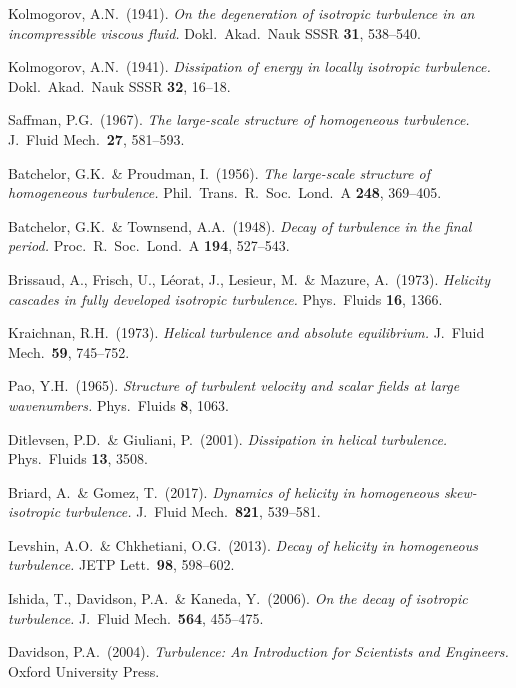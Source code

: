 \documentclass[12pt,a4paper]{article}
\theoremstyle{plain}
\theoremstyle{definition}
\begin{document}
\begin{enumerate}[leftmargin=*, label={[\arabic*]}]

\item Kolmogorov, A.N.\ (1941).
  \textit{On the degeneration of isotropic turbulence in an incompressible
  viscous fluid.}
  Dokl.\ Akad.\ Nauk SSSR \textbf{31}, 538--540.

\item Kolmogorov, A.N.\ (1941).
  \textit{Dissipation of energy in locally isotropic turbulence.}
  Dokl.\ Akad.\ Nauk SSSR \textbf{32}, 16--18.

\item Saffman, P.G.\ (1967).
  \textit{The large-scale structure of homogeneous turbulence.}
  J.\ Fluid Mech.\ \textbf{27}, 581--593.

\item Batchelor, G.K.\ \& Proudman, I.\ (1956).
  \textit{The large-scale structure of homogeneous turbulence.}
  Phil.\ Trans.\ R.\ Soc.\ Lond.\ A \textbf{248}, 369--405.

\item Batchelor, G.K.\ \& Townsend, A.A.\ (1948).
  \textit{Decay of turbulence in the final period.}
  Proc.\ R.\ Soc.\ Lond.\ A \textbf{194}, 527--543.

\item Brissaud, A., Frisch, U., L\'eorat, J., Lesieur, M.\ \& Mazure, A.\
  (1973).
  \textit{Helicity cascades in fully developed isotropic turbulence.}
  Phys.\ Fluids \textbf{16}, 1366.

\item Kraichnan, R.H.\ (1973).
  \textit{Helical turbulence and absolute equilibrium.}
  J.\ Fluid Mech.\ \textbf{59}, 745--752.

\item Pao, Y.H.\ (1965).
  \textit{Structure of turbulent velocity and scalar fields at large
  wavenumbers.}
  Phys.\ Fluids \textbf{8}, 1063.

\item Ditlevsen, P.D.\ \& Giuliani, P.\ (2001).
  \textit{Dissipation in helical turbulence.}
  Phys.\ Fluids \textbf{13}, 3508.

\item Briard, A.\ \& Gomez, T.\ (2017).
  \textit{Dynamics of helicity in homogeneous skew-isotropic turbulence.}
  J.\ Fluid Mech.\ \textbf{821}, 539--581.

\item Levshin, A.O.\ \& Chkhetiani, O.G.\ (2013).
  \textit{Decay of helicity in homogeneous turbulence.}
  JETP Lett.\ \textbf{98}, 598--602.

\item Ishida, T., Davidson, P.A.\ \& Kaneda, Y.\ (2006).
  \textit{On the decay of isotropic turbulence.}
  J.\ Fluid Mech.\ \textbf{564}, 455--475.

\item Davidson, P.A.\ (2004).
  \textit{Turbulence: An Introduction for Scientists and Engineers.}
  Oxford University Press.

\end{enumerate}
\end{document}

